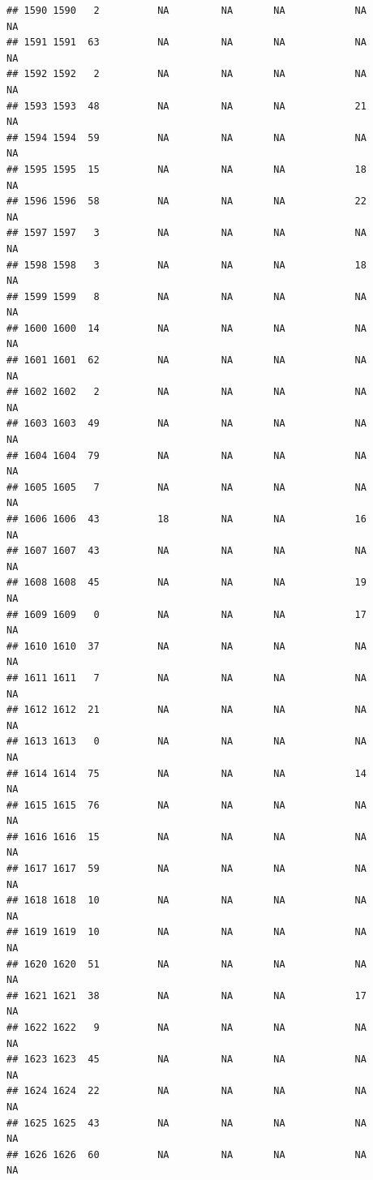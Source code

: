 \documentclass[man]{apa6}
\begin{document}
\begin{verbatim}
## 1590 1590   2          NA         NA       NA            NA       NA
## 1591 1591  63          NA         NA       NA            NA       NA
## 1592 1592   2          NA         NA       NA            NA       NA
## 1593 1593  48          NA         NA       NA            21       NA
## 1594 1594  59          NA         NA       NA            NA       NA
## 1595 1595  15          NA         NA       NA            18       NA
## 1596 1596  58          NA         NA       NA            22       NA
## 1597 1597   3          NA         NA       NA            NA       NA
## 1598 1598   3          NA         NA       NA            18       NA
## 1599 1599   8          NA         NA       NA            NA       NA
## 1600 1600  14          NA         NA       NA            NA       NA
## 1601 1601  62          NA         NA       NA            NA       NA
## 1602 1602   2          NA         NA       NA            NA       NA
## 1603 1603  49          NA         NA       NA            NA       NA
## 1604 1604  79          NA         NA       NA            NA       NA
## 1605 1605   7          NA         NA       NA            NA       NA
## 1606 1606  43          18         NA       NA            16       NA
## 1607 1607  43          NA         NA       NA            NA       NA
## 1608 1608  45          NA         NA       NA            19       NA
## 1609 1609   0          NA         NA       NA            17       NA
## 1610 1610  37          NA         NA       NA            NA       NA
## 1611 1611   7          NA         NA       NA            NA       NA
## 1612 1612  21          NA         NA       NA            NA       NA
## 1613 1613   0          NA         NA       NA            NA       NA
## 1614 1614  75          NA         NA       NA            14       NA
## 1615 1615  76          NA         NA       NA            NA       NA
## 1616 1616  15          NA         NA       NA            NA       NA
## 1617 1617  59          NA         NA       NA            NA       NA
## 1618 1618  10          NA         NA       NA            NA       NA
## 1619 1619  10          NA         NA       NA            NA       NA
## 1620 1620  51          NA         NA       NA            NA       NA
## 1621 1621  38          NA         NA       NA            17       NA
## 1622 1622   9          NA         NA       NA            NA       NA
## 1623 1623  45          NA         NA       NA            NA       NA
## 1624 1624  22          NA         NA       NA            NA       NA
## 1625 1625  43          NA         NA       NA            NA       NA
## 1626 1626  60          NA         NA       NA            NA       NA

\end{verbatim}
\end{document}
